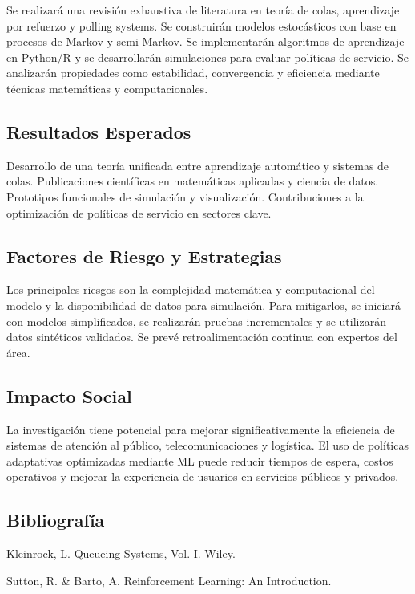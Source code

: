 \documentclass[12pt]{article}
\begin{document}
Se realizará una revisión exhaustiva de literatura en teoría de colas, aprendizaje por refuerzo y polling systems. Se construirán modelos estocásticos con base en procesos de Markov y semi-Markov. Se implementarán algoritmos de aprendizaje en Python/R y se desarrollarán simulaciones para evaluar políticas de servicio. Se analizarán propiedades como estabilidad, convergencia y eficiencia mediante técnicas matemáticas y computacionales.

\subsection*{Resultados Esperados}

Desarrollo de una teoría unificada entre aprendizaje automático y sistemas de colas. Publicaciones científicas en matemáticas aplicadas y ciencia de datos. Prototipos funcionales de simulación y visualización. Contribuciones a la optimización de políticas de servicio en sectores clave.

\subsection*{Factores de Riesgo y Estrategias}

Los principales riesgos son la complejidad matemática y computacional del modelo y la disponibilidad de datos para simulación. Para mitigarlos, se iniciará con modelos simplificados, se realizarán pruebas incrementales y se utilizarán datos sintéticos validados. Se prevé retroalimentación continua con expertos del área.

\subsection*{Impacto Social}

La investigación tiene potencial para mejorar significativamente la eficiencia de sistemas de atención al público, telecomunicaciones y logística. El uso de políticas adaptativas optimizadas mediante ML puede reducir tiempos de espera, costos operativos y mejorar la experiencia de usuarios en servicios públicos y privados.

\subsection*{Bibliografía}

Kleinrock, L. Queueing Systems, Vol. I. Wiley.

Sutton, R. & Barto, A. Reinforcement Learning: An Introduction.
\end{document}
